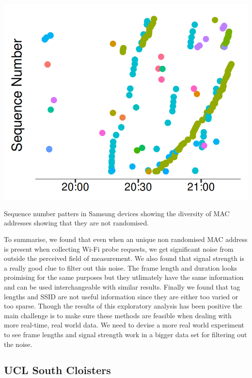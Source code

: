 \begin{marginfigure}
  \forcerectofloat
  \includegraphics{images/home-samsung-google.png}
  \caption{Sequence number patters in Samsung devices showing the diversity of MAC addresses showing that they are not randomised.}
  \label{figure:collection:home:samsung}
\end{marginfigure}

To summarise, we found that even when an unique non randomised MAC address is present when collecting Wi-Fi probe requests, we get significant noise from outside the perceived field of measurement.
We also found that signal strength is a really good clue to filter out this noise.
The frame length and duration looks proimising for the same purposes but they utlimately have the same information and can be used interchangeable with similar results.
Finally we found that tag lengths and SSID are not useful information since they are either too varied or too sparse.
Though the results of this exploratory analysis has been positive the main challenge is to make sure these methods are feasible when dealing with more real-time, real world data.
We need to devise a more real world experiment to see frame lengths and signal strength work in a bigger data set for filtering out the noise. 

\subsection{UCL South Cloisters}

